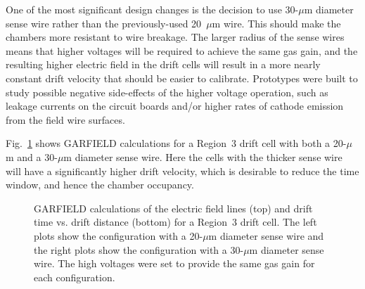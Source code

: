 One of the most significant design changes is the decision 
to use 30-$\mu$m diameter sense wire rather than the previously-used 
20~$\mu$m wire. 
This should make the chambers more resistant to wire 
breakage.  The larger radius of the sense wires means that higher 
voltages will be required to achieve the same gas gain, 
and the resulting higher electric field in the drift cells will result in 
a more nearly constant drift velocity that should be easier to calibrate.
Prototypes were built to study possible negative side-effects of the 
higher voltage operation, such as leakage currents on the circuit boards 
and/or higher rates of cathode emission from the field wire surfaces.

Fig.~\ref{garfield} shows GARFIELD calculations for a Region~3 drift cell
with both a 20-$\mu$m and a 30-$\mu$m diameter sense wire.  Here the
cells with the thicker sense wire will have a significantly higher drift 
velocity, which is desirable to reduce the time window, and hence the 
chamber occupancy.

\begin{figure}[ht]
\vspace{12.0cm}
\caption{\small{GARFIELD calculations of the electric field lines (top)
and drift time vs. drift distance (bottom) for a Region~3 drift cell.  The 
left plots show the configuration with a 20-$\mu$m diameter sense wire and 
the right plots show the configuration with a 30-$\mu$m diameter sense wire.
The high voltages were set to provide the same gas gain for each
configuration.}}
\label{garfield}
\end{figure}
 
